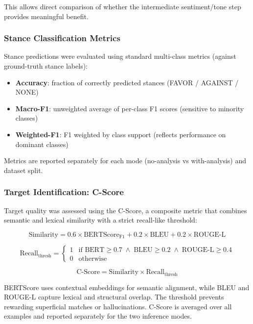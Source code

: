 \documentclass[conference]{IEEEtran}
\begin{document}
This allows direct comparison of whether the intermediate sentiment/tone step provides meaningful benefit.

\subsubsection{Stance Classification Metrics}

Stance predictions were evaluated using standard multi-class metrics (against ground-truth stance labels):
\begin{itemize}
    \item \textbf{Accuracy}: fraction of correctly predicted stances (FAVOR / AGAINST / NONE)
    \item \textbf{Macro-F1}: unweighted average of per-class F1 scores (sensitive to minority classes)
    \item \textbf{Weighted-F1}: F1 weighted by class support (reflects performance on dominant classes)
\end{itemize}

Metrics are reported separately for each mode (no-analysis vs with-analysis) and dataset split.

\subsubsection{Target Identification: C-Score}

Target quality was assessed using the C-Score, a composite metric that combines semantic and lexical similarity with a strict recall-like threshold:

\begin{equation}
\text{Similarity} = 0.6 \times \text{BERTScore}_\text{F1} + 0.2 \times \text{BLEU} + 0.2 \times \text{ROUGE-L}
\end{equation}

\begin{equation}
\text{Recall}_\text{thresh} = 
\begin{cases} 
1 & \text{if BERT}\geq 0.7 \;\land\; \text{BLEU} \geq 0.2 \;\land\; \text{ROUGE-L} \geq 0.4 \\
0 & \text{otherwise}
\end{cases}
\end{equation}

\begin{equation}
\text{C-Score} = \text{Similarity} \times \text{Recall}_\text{thresh}
\end{equation}

BERTScore uses contextual embeddings for semantic alignment, while BLEU and ROUGE-L capture lexical and structural overlap. The threshold prevents rewarding superficial matches or hallucinations. C-Score is averaged over all examples and reported separately for the two inference modes.
\end{document}
